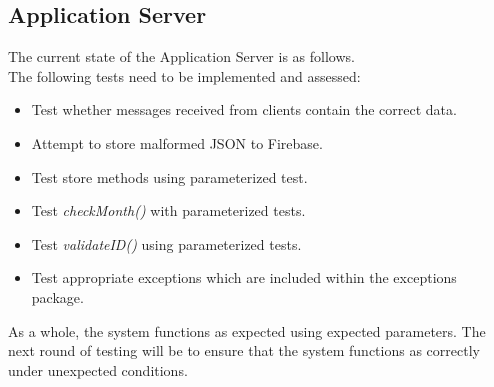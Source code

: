 \documentclass[a4paper,10pt]{article}
\begin{document}
		\subsection{Application Server}
		The current state of the Application Server is as follows.
		\\The following tests need to be implemented and assessed:
			\begin{itemize}
				\item Test whether messages received from clients contain the correct data.
				\item Attempt to store malformed JSON to Firebase.
				\item Test store methods using parameterized test.
				\item Test \textit{checkMonth()} with parameterized tests.
				\item Test \textit{validateID()} using parameterized tests.
				\item Test appropriate exceptions which are included within the exceptions package.
			\end{itemize}
			
		As a whole, the system functions as expected using expected parameters.
		The next round of testing will be to ensure that the system functions as correctly under unexpected conditions.
\end{document}
